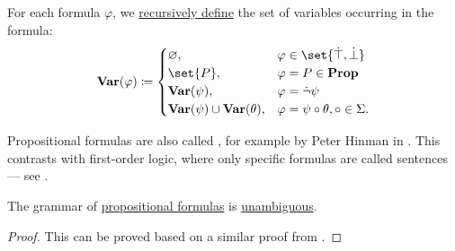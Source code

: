 \begin{definition}
\begin{thmenum}
     For each formula \( \varphi \), we \hyperref[rem:evaluation]{recursively define} the set of variables occurring in the formula:
    \begin{equation}\label{eq:def:propositional_syntax/varables}
      \boldop{Var}(\varphi) \coloneqq \begin{cases}
        \varnothing,                                  &\varphi \in \set{ \syntop, \synbot } \\
        \set{ P },                                    &\varphi = P \in \boldop{Prop} \\
        \boldop{Var}(\psi),                           &\varphi = \synneg \psi \\
        \boldop{Var}(\psi) \cup \boldop{Var}(\theta), &\varphi = \psi \bincirc \theta, \bincirc \in \Sigma.
      \end{cases}
    \end{equation}
  \end{thmenum}
\end{definition}
\begin{comments}
  \item Propositional formulas are also called , for example by Peter Hinman in . This contrasts with first-order logic, where only specific formulas are called sentences --- see .
\end{comments}

\begin{proposition}\label{thm:propositional_formulas_are_unambiguous}
  The grammar of \hyperref[def:propositional_syntax/formula]{propositional formulas} is \hyperref[def:grammar_ambiguity]{unambiguous}.
\end{proposition}
\begin{proof}
  This can be proved based on a similar proof from .
\end{proof}

